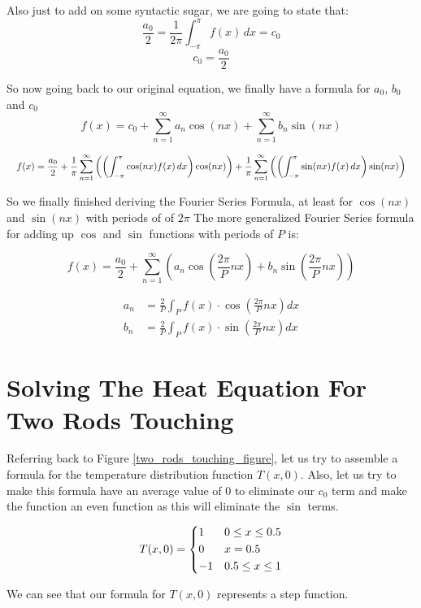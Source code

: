 \documentclass{report}
\newcommand\scalemath[2]{\scalebox{#1}{\mbox{\ensuremath{\displaystyle #2}}}}
\begin{document}
Also just to add on some syntactic sugar, we are going to state that: 
\[\frac{a_0}{2} = \frac{1}{2\pi}\int_{-\pi}^{\pi} f(x) \, dx = c_0\]
\[c_0 = \frac{a_0}{2} \]


So now going back to our original equation, we finally have a formula for $a_0$, $b_0$ and $c_0$
\[ f(x)= c_0 + \sum_{n=1}^{\infty} a_n\cos(nx) + \sum_{n=1}^{\infty} b_n\sin(nx) \]

\[ \scalemath{0.825}{
f(x)= \frac{a_0}{2} + \frac{1}{\pi} \sum_{n=1}^{\infty} \left( \left( \int_{-\pi}^{\pi} \cos(nx)f(x) \, dx \right) \cos(nx) \right)
+ \frac{1}{\pi} \sum_{n=1}^{\infty} \left( \left( \int_{-\pi}^{\pi} \sin(nx)f(x) \, dx \right) \sin(nx) \right) }
\]

So we finally finished deriving the Fourier Series Formula, at least for $\cos(nx)$ and $\sin(nx)$ with periods of of $2\pi$
The more generalized Fourier Series formula for adding up $\cos$ and $\sin$ functions with periods of $P$ is:

\[f(x) = \frac{a_{0}}{2}+\sum_{n=1}^{\infty}\left(a_{n} \cos \left(\frac{2 \pi}{P} n x\right)+b_{n} \sin \left(\frac{2 \pi}{P} n x\right)\right) \]

\[\begin{aligned}
a_{n} &=\frac{2}{P} \int_{P} f(x) \cdot \cos \left(\frac{2 \pi}{P} n x\right) d x \\ 
b_{n} &=\frac{2}{P} \int_{P} f(x) \cdot \sin \left(\frac{2 \pi}{P} n x\right) d x
\end{aligned} \]

\pagebreak

\section{Solving The Heat Equation For Two Rods Touching }
Referring back to Figure \ref{two_rods_touching_figure}, let us try to assemble a formula for the temperature distribution function
$T(x,0)$. Also, let us try to make this formula have an average value of $0$ to eliminate our $c_0$ term and make the function
an even function as this will eliminate the $\sin$ terms.

\[ T(x,0) =
    \begin{dcases}
        1 & 0\leq x \leq 0.5 \\
        0 & x = 0.5 \\
        -1 & 0.5 \leq x \leq 1 \\
    \end{dcases}
\]

We can see that our formula for $T(x,0)$ represents a step function. 
\end{document}
